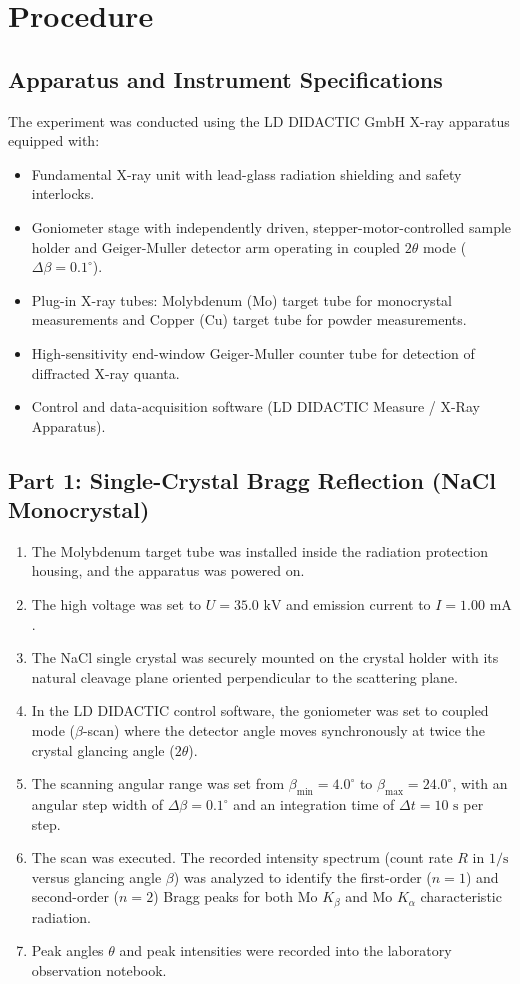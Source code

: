 \documentclass[12pt,a4paper]{article}
\begin{document}
\section{Procedure}

\subsection{Apparatus and Instrument Specifications}
The experiment was conducted using the LD DIDACTIC GmbH X-ray apparatus equipped with:
\begin{itemize}
    \item Fundamental X-ray unit with lead-glass radiation shielding and safety interlocks.
    \item Goniometer stage with independently driven, stepper-motor-controlled sample holder and Geiger-Muller detector arm operating in coupled $2\theta$ mode ($\Delta\beta = 0.1^\circ$).
    \item Plug-in X-ray tubes: Molybdenum (Mo) target tube for monocrystal measurements and Copper (Cu) target tube for powder measurements.
    \item High-sensitivity end-window Geiger-Muller counter tube for detection of diffracted X-ray quanta.
    \item Control and data-acquisition software (LD DIDACTIC Measure / X-Ray Apparatus).
\end{itemize}

\subsection{Part 1: Single-Crystal Bragg Reflection (NaCl Monocrystal)}
\begin{enumerate}
    \item The Molybdenum target tube was installed inside the radiation protection housing, and the apparatus was powered on.
    \item The high voltage was set to $U = 35.0\text{ kV}$ and emission current to $I = 1.00\text{ mA}$.
    \item The NaCl single crystal was securely mounted on the crystal holder with its natural cleavage plane oriented perpendicular to the scattering plane.
    \item In the LD DIDACTIC control software, the goniometer was set to coupled mode ($\beta$-scan) where the detector angle moves synchronously at twice the crystal glancing angle ($2\theta$).
    \item The scanning angular range was set from $\beta_{\min} = 4.0^\circ$ to $\beta_{\max} = 24.0^\circ$, with an angular step width of $\Delta\beta = 0.1^\circ$ and an integration time of $\Delta t = 10\text{ s}$ per step.
    \item The scan was executed. The recorded intensity spectrum (count rate $R$ in $1/\text{s}$ versus glancing angle $\beta$) was analyzed to identify the first-order ($n=1$) and second-order ($n=2$) Bragg peaks for both $\text{Mo } K_\beta$ and $\text{Mo } K_\alpha$ characteristic radiation.
    \item Peak angles $\theta$ and peak intensities were recorded into the laboratory observation notebook.
\end{enumerate}
\end{document}

